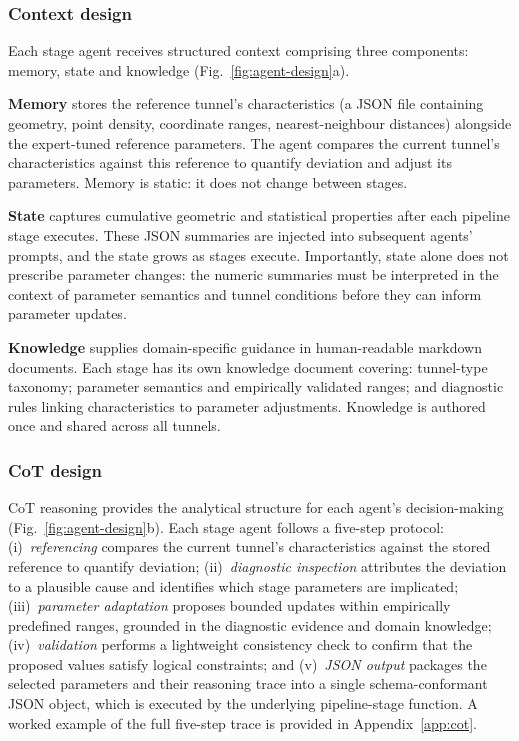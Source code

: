 \documentclass[a4paper,fleqn]{cas-dc}
\begin{document}
\subsubsection{Context design}\label{sec:context-comp}

Each stage agent receives structured context comprising three components: memory, state and knowledge (Fig.~\ref{fig:agent-design}a).

\textbf{Memory} stores the reference tunnel's characteristics (a JSON file containing geometry, point density, coordinate ranges, nearest-neighbour distances) alongside the expert-tuned reference parameters. The agent compares the current tunnel's characteristics against this reference to quantify deviation and adjust its parameters. Memory is static: it does not change between stages.

\textbf{State} captures cumulative geometric and statistical properties after each pipeline stage executes. These JSON summaries are injected into subsequent agents' prompts, and the state grows as stages execute. Importantly, state alone does not prescribe parameter changes: the numeric summaries must be interpreted in the context of parameter semantics and tunnel conditions before they can inform parameter updates.

\textbf{Knowledge} supplies domain-specific guidance in human-readable markdown documents. Each stage has its own knowledge document covering: tunnel-type taxonomy; parameter semantics and empirically validated ranges; and diagnostic rules linking characteristics to parameter adjustments. Knowledge is authored once and shared across all tunnels.

\subsubsection{CoT design}\label{sec:cot}

CoT reasoning provides the analytical structure for each agent's decision-making (Fig.~\ref{fig:agent-design}b). Each stage agent follows a five-step protocol: (i)~\emph{referencing} compares the current tunnel's characteristics against the stored reference to quantify deviation; (ii)~\emph{diagnostic inspection} attributes the deviation to a plausible cause and identifies which stage parameters are implicated; (iii)~\emph{parameter adaptation} proposes bounded updates within empirically predefined ranges, grounded in the diagnostic evidence and domain knowledge; (iv)~\emph{validation} performs a lightweight consistency check to confirm that the proposed values satisfy logical constraints; and (v)~\emph{JSON output} packages the selected parameters and their reasoning trace into a single schema-conformant JSON object, which is executed by the underlying pipeline-stage function. A worked example of the full five-step trace is provided in Appendix~\ref{app:cot}.
\end{document}
